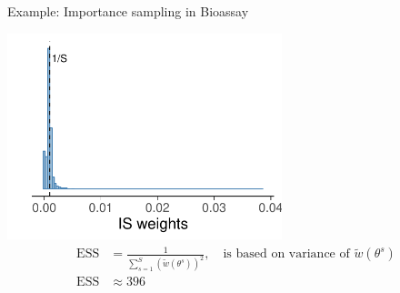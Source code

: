 \documentclass[english,t]{beamer}
\begin{document}
\begin{frame}{Example: Importance sampling in Bioassay}

       \begin{center}
         \vspace{-\baselineskip}
       \includegraphics[width=8cm]{bioassayisw2.pdf}\\
         \vspace{-2\baselineskip}
         \begin{align*}
           \text{ESS} & = \frac{1}{\sum_{s=1}^S (\tilde{w}(\theta^s))^2}, \quad \text{is based on variance of } \tilde{w}(\theta^s) \\
           \text{ESS} & \approx 396 \\
         \end{align*}
       \end{center}
       
         \vspace{-2\baselineskip}

\end{frame}
\end{document}
